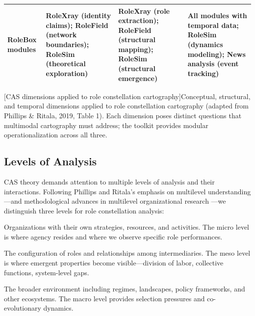 \documentclass[../main.tex]{subfiles}
\begin{document}
\begin{wideblock}
\begin{center}
\begin{tabular}{@{}p{2.2cm}p{3.8cm}p{3.8cm}p{3.8cm}@{}}
\addlinespace
\textbf{RoleBox modules} &
RoleXray (identity claims); RoleField (network boundaries); RoleSim (theoretical exploration) &
RoleXray (role extraction); RoleField (structural mapping); RoleSim (structural emergence) &
All modules with temporal data; RoleSim (dynamics modeling); News analysis (event tracking) \\
\bottomrule
\end{tabular}
[CAS dimensions applied to role constellation cartography]{Conceptual, structural, and temporal dimensions applied to role constellation cartography (adapted from Phillips \& Ritala, 2019, Table 1). Each dimension poses distinct questions that multimodal cartography must address; the \RoleBox{} toolkit provides modular operationalization across all three.}
\end{center}
\end{wideblock}

\subsection{Levels of Analysis}

CAS theory demands attention to multiple levels of analysis and their interactions. Following Phillips and Ritala's emphasis on multilevel understanding---and methodological advances in multilevel organizational research \cite{kozlowski2013advancing, zappa2015multilevel}---we distinguish three levels for role constellation analysis:

\begin{description}[leftmargin=0.5cm, itemsep=0.3em]
\item[Micro level: Individual intermediaries] Organizations with their own strategies, resources, and activities. The micro level is where agency resides and where we observe specific role performances.

\item[Meso level: The constellation] The configuration of roles and relationships among intermediaries. The meso level is where emergent properties become visible---division of labor, collective functions, system-level gaps.

\item[Macro level: The transition context] The broader environment including regimes, landscapes, policy frameworks, and other ecosystems. The macro level provides selection pressures and co-evolutionary dynamics.
\end{description}
\end{document}
